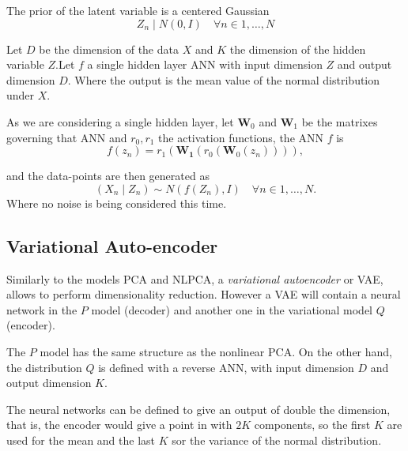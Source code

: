 The prior of the latent variable is a centered Gaussian
\[
  Z_{n} \mid N(0,I) \quad \forall n \in 1,\dots,N
\]

Let \(D\) be the dimension of the data \(X\) and \(K\) the dimension of the hidden variable \(Z\).Let \(f\) a single hidden layer ANN with input dimension \(Z\) and output dimension \(D\). Where the output is the mean value of the normal distribution under \(X\).

As we are considering a single hidden layer, let \(\bm{W}_{0}\) and \(\bm{W}_{1}\) be the matrixes governing that ANN and \(r_{0}, r_{1}\) the activation functions, the ANN \(f\) is
\[
  f(z_{n}) = r_{1}(\bm{W_{1}}(r_{0}(\bm{W}_{0}(z_{n})))),
\]

and the data-points are then generated as
\[
  (X_{n}\mid Z_{n}) \sim N(f(Z_{n}), I) \quad \forall n \in 1,\dots,N.
\]
Where no noise is being considered this time.

\subsection{Variational Auto-encoder}

Similarly to the models PCA and NLPCA, a \emph{variational autoencoder} or VAE, allows to perform dimensionality reduction. However a VAE will contain a neural network in the \(P\)  model (decoder) and another one in the variational model \(Q\) (encoder).

The \(P\) model has the same structure as the nonlinear PCA. On the other hand, the  distribution \(Q\) is defined with a reverse ANN, with input dimension \(D\) and output dimension \(K\).

The neural networks can be defined to give an output of double the dimension, that is, the encoder would give a point in with \( 2K \) components, so the first \( K \) are used for the mean and the last \( K \) sor the variance of the normal distribution.  
